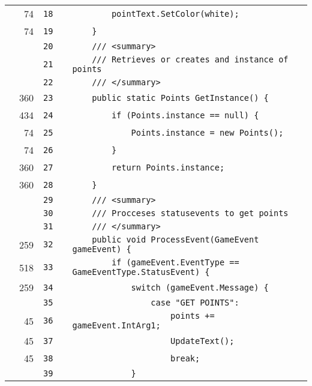 \documentclass[a4paper,landscape,10pt]{article}
\begin{document}
\begin{longtable}[l]{lrrll}
\cellcolor{green} & 74 & \verb~18~ & & \verb~        pointText.SetColor(white);~\\
\cellcolor{green} & 74 & \verb~19~ & & \verb~    }~\\
\cellcolor{gray} &  & \verb~20~ & & \verb~    /// <summary>~\\
\cellcolor{gray} &  & \verb~21~ & & \verb~    /// Retrieves or creates and instance of points~\\
\cellcolor{gray} &  & \verb~22~ & & \verb~    /// </summary>~\\
\cellcolor{green} & 360 & \verb~23~ & & \verb~    public static Points GetInstance() {~\\
\cellcolor{green} & 434 & \verb~24~ & & \verb~        if (Points.instance == null) {~\\
\cellcolor{green} & 74 & \verb~25~ & & \verb~            Points.instance = new Points();~\\
\cellcolor{green} & 74 & \verb~26~ & & \verb~        }~\\
\cellcolor{green} & 360 & \verb~27~ & & \verb~        return Points.instance;~\\
\cellcolor{green} & 360 & \verb~28~ & & \verb~    }~\\
\cellcolor{gray} &  & \verb~29~ & & \verb~    /// <summary>~\\
\cellcolor{gray} &  & \verb~30~ & & \verb~    /// Procceses statusevents to get points~\\
\cellcolor{gray} &  & \verb~31~ & & \verb~    /// </summary>~\\
\cellcolor{green} & 259 & \verb~32~ & & \verb~    public void ProcessEvent(GameEvent gameEvent) {~\\
\cellcolor{green} & 518 & \verb~33~ & & \verb~        if (gameEvent.EventType == GameEventType.StatusEvent) {~\\
\cellcolor{green} & 259 & \verb~34~ & & \verb~            switch (gameEvent.Message) {~\\
\cellcolor{gray} &  & \verb~35~ & & \verb~                case "GET POINTS":~\\
\cellcolor{green} & 45 & \verb~36~ & & \verb~                    points += gameEvent.IntArg1;~\\
\cellcolor{green} & 45 & \verb~37~ & & \verb~                    UpdateText();~\\
\cellcolor{green} & 45 & \verb~38~ & & \verb~                    break;~\\
\cellcolor{gray} &  & \verb~39~ & & \verb~            }~\\

\end{longtable}
\end{document}
